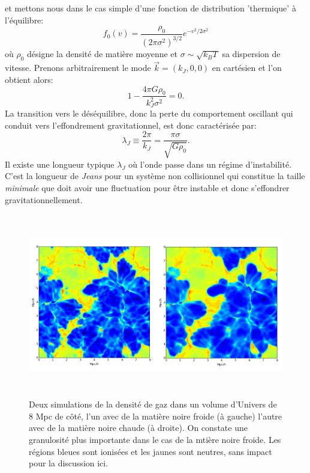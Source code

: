  et mettons nous dans le cas simple d'une fonction de distribution 'thermique' à l'équilibre:
\begin{equation}
f_0(v)=\frac{\rho_0}{(2\pi\sigma^2)^{3/2}}e^{-v^2/2\sigma^2}
\end{equation}
où $\rho_0$ désigne la densité de matière moyenne et $\sigma\sim \sqrt{k_B T}$ sa dispersion de vitesse. Prenons arbitrairement le mode $\vec{k}=(k_J,0,0)$ en cartésien et l'on obtient alors:
\begin{equation}
1-\frac{4\pi G \rho_0}{k_J^2\sigma^2}=0.
\end{equation}
La transition vers le déséquilibre, donc la perte du comportement oscillant qui conduit vers l'effondrement gravitationnel, est donc caractérisée par:
\begin{equation}
\lambda_J\equiv\frac{2\pi}{k_J}=\frac{\pi \sigma}{\sqrt{G\rho_0}}.
\end{equation} 
Il existe une longueur typique $\lambda_J$ où l'onde passe dans un régime d'instabilité. C'est la longueur de \textit{Jeans} pour un système non collisionnel qui constitue la taille \textit{minimale} que doit avoir une fluctuation pour être instable et donc s'effondrer gravitationnellement.

\begin{figure}[htbp]
	\centering
		\includegraphics[height=8cm]{figs/wdm.png}
	\caption{Deux simulations de la densité de gaz dans un volume d'Univers de 8 Mpc de côté, l'un avec de la matière noire froide (à gauche) l'autre avec de la matière noire chaude (à droite). On constate une granulosité plus importante dans le cas de la mtière noire froide. Les régions bleues sont ionisées et les jaunes sont neutres, sans impact pour la discussion ici.} 
	\label{f:wdm}
\end{figure}

